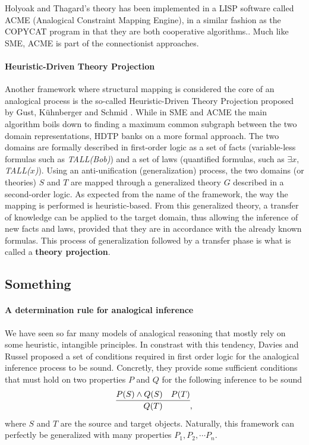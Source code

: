 Holyoak and Thagard's theory has been implemented in a LISP software called
ACME (Analogical Constraint Mapping Engine), in a similar fashion as the
COPYCAT program in that they are both cooperative algorithms.. Much like SME, ACME is part of the connectionist approaches.

\paragraph{Heuristic-Driven Theory Projection\\}

Another framework where structural mapping is considered the core of an
analogical process is the so-called Heuristic-Driven Theory Projection proposed
by Gust, K\"uhnberger and Schmid \cite{GusKunSchTCS06}. While in SME and ACME
the main algorithm boils down to finding a maximum common subgraph between the
two domain representations, HDTP banks on a more formal approach. The two
domains are formally described in first-order logic as a set of facts
(variable-less formulas such as \textit{TALL(Bob)}) and a set of laws
(quantified formulas, such as \textit{$\exists x,$ TALL($x$)}). Using an
anti-unification (generalization) process, the two domains (or theories) $S$
and $T$ are mapped through a generalized theory $G$ described in a second-order
logic. As expected from the name of the framework, the way the mapping is
performed is heuristic-based. From this generalized theory, a transfer of
knowledge can be applied to the target domain, thus allowing the inference of
new facts and laws, provided that they are in accordance with the already known
formulas.  This process of generalization followed by a transfer phase is what
is called a \textbf{theory projection}.

\subsection{Something}

\paragraph{A determination rule for analogical inference\\}

We have seen so far many models of analogical reasoning that mostly rely on
some heuristic, intangible principles. In constrast with this tendency, Davies
and Russel proposed a set of conditions required in first order logic for the
analogical inference process to be sound. Concretly, they provide some
sufficient conditions that must hold on two properties $P$ and $Q$ for the
following inference to be sound
$$\infer{Q(T)}{P(S) \wedge Q(S) & P(T)},$$
where $S$ and $T$ are the source and target objects. Naturally, this framework
can perfectly be generalized with many properties $P_1, P_2, \cdots P_n$.

